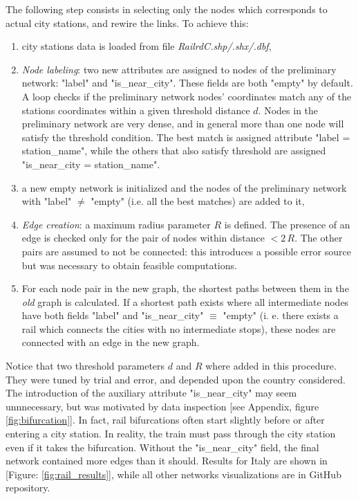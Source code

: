 \bigskip \newline 
The following step consists in selecting only the nodes which corresponds to actual city stations, and rewire the links. To achieve this:
\begin{enumerate}
    \item city stations data is loaded from file \textit{RailrdC.shp/.shx/.dbf},
    \item \textit{Node labeling}: two new attributes are assigned to nodes of the preliminary network: "label" and "is\_near\_city". These fields are both "empty" by default.
    A loop checks if the preliminary network nodes' coordinates match any of the stations coordinates within a given threshold distance $d$. Nodes in the preliminary network are very dense, and in general more than one node will satisfy the threshold condition. The best match is assigned attribute "label = station\_name", while the others that also satisfy threshold are assigned "is\_near\_city = station\_name". 
    \item a new empty network is initialized and the nodes of the preliminary network with "label" $\neq$ "empty" (i.e. all the best matches) are added to it,
    \item \textit{Edge creation}: a maximum radius parameter $R$ is defined. The presence of an edge is checked only for the pair of nodes within distance $<2\,R$. The other pairs are assumed to not be connected: this introduces a possible error source but was necessary to obtain feasible computations.
    \item For each node pair in the new graph, the shortest paths between them in the \textit{old} graph is calculated. If a shortest path exists where all intermediate nodes have both fields "label" and "is\_near\_city" $\equiv$ "empty" (i. e. there exists a rail which connects the cities with no intermediate stops), these nodes are connected with an edge in the new graph.
\end{enumerate}
Notice that two threshold parameters $d$ and $R$ where added in this procedure. They were tuned by trial and error, and depended upon the country considered. The introduction of the auxiliary attribute "is\_near\_city" may seem unnnecessary, but was motivated by data inspection [see Appendix, figure \ref{fig:bifurcation}]. In fact, rail bifurcations often start slightly before or after entering a city station. In reality, the train must pass through the city station even if it takes the bifurcation. Without the "is\_near\_city" field, the final network contained more edges than it should. Results for Italy are shown in [Figure: \ref{fig:rail_results}], while all other networks visualizations are in GitHub repository.
